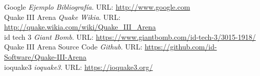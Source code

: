 \documentclass[a4paper,12pt]{report}
\begin{document}
	
	\begin{thebibliography}{9}
		
		Google \emph{Ejemplo Bibliografía}. URL: \url{http://www.google.com}\\
		Quake III Arena \emph{Quake Wikia}. URL: \url{http://quake.wikia.com/wiki/Quake_III_Arena}\\
		 id tech 3 \emph{Giant Bomb}. URL: \url{https://www.giantbomb.com/id-tech-3/3015-1918/}\\
		 Quake III Arena Source Code \emph{Github}. URL: \url{https://github.com/id-Software/Quake-III-Arena}\\
		 ioquake3 \emph{ioquake3}. URL: \url{https://ioquake3.org/}
		
		
	\end{thebibliography}
	
	
\end{document}
